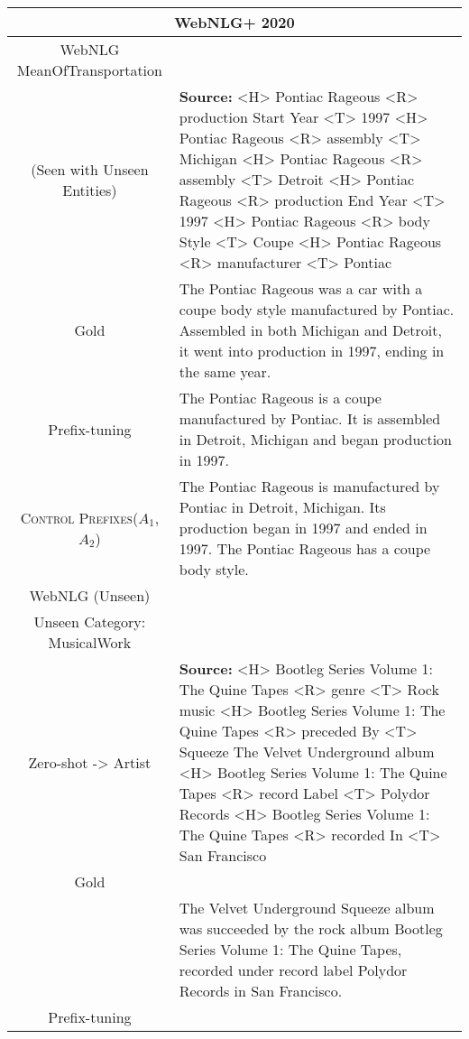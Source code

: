 \documentclass[11pt]{article}
\newcommand{\control}{\textsc{Control Prefixes}\xspace}
\newcommand{\bl}[1]{{\color{blue}  #1}}
\newcommand{\rd}[1]{{\color{red}  #1}}
\begin{document}
\begin{table*}[bth!]
\scriptsize
  \centering
  \renewcommand{\arraystretch}{1.1}
  \begin{tabular}{c|p{}}
  \hline
 
  \multicolumn{2}{c}{\textbf{WebNLG+ 2020}} \\ \hline
\bl{WebNLG} \rd{MeanOfTransportation}\\(Seen with Unseen Entities) & \textbf{Source:} <H> Pontiac Rageous <R> production Start Year <T> 1997 <H> Pontiac Rageous <R> assembly <T> Michigan <H> Pontiac Rageous <R> assembly <T> Detroit <H> Pontiac Rageous <R> production End Year <T> 1997 <H> Pontiac Rageous <R> body Style <T> Coupe <H> Pontiac Rageous <R> manufacturer <T> Pontiac \\ \hline

  
Gold
& The Pontiac Rageous was a car with a coupe body style manufactured by Pontiac. Assembled in both Michigan and Detroit, it went into production in 1997, ending in the same year.\\ \hline
Prefix-tuning


& The Pontiac Rageous is a coupe manufactured by Pontiac. It is assembled in Detroit, Michigan and began production in 1997.\\ \hline
\control ($A_{1}$,$A_{2}$)
& The Pontiac Rageous is manufactured by Pontiac in Detroit, Michigan. Its production began in 1997 and ended in 1997. The Pontiac Rageous has a coupe body style.



\\ \midrule \hline
  \bl{WebNLG} (Unseen) \\ Unseen Category: MusicalWork\\
  Zero-shot -> \rd{Artist} & \textbf{Source:} <H> Bootleg Series Volume 1: The Quine Tapes <R> genre <T> Rock music <H> Bootleg Series Volume 1: The Quine Tapes <R> preceded By <T> Squeeze The Velvet Underground album <H> Bootleg Series Volume 1: The Quine Tapes <R> record Label <T> Polydor Records <H> Bootleg Series Volume 1: The Quine Tapes <R> recorded In <T> San Francisco\\ \hline
  
  

  
Gold\\ & The Velvet Underground Squeeze album was succeeded by the rock album Bootleg Series Volume 1: The Quine Tapes, recorded under record label Polydor Records in San Francisco.\\ \hline
Prefix-tuning\\



\end{tabular}
\end{table*}
\end{document}
